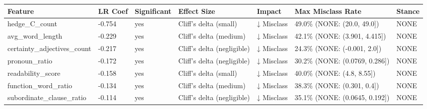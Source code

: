 \begin{tabular}{lllllll}
\toprule
Feature & LR Coef & Significant & Effect Size & Impact & Max Misclass Rate & Stance \\
\midrule
hedge\_C\_count & -0.754 & yes & Cliff's delta (small) & ↓ Misclass & 49.0\% (NONE: (20.0, 49.0]) & NONE \\
avg\_word\_length & -0.229 & yes & Cliff's delta (medium) & ↓ Misclass & 42.1\% (NONE: (3.901, 4.415]) & NONE \\
certainty\_adjectives\_count & -0.217 & yes & Cliff's delta (negligible) & ↓ Misclass & 24.3\% (NONE: (-0.001, 2.0]) & NONE \\
pronoun\_ratio & -0.172 & yes & Cliff's delta (negligible) & ↓ Misclass & 30.2\% (NONE: (0.0769, 0.286]) & NONE \\
readability\_score & -0.158 & yes & Cliff's delta (small) & ↓ Misclass & 40.0\% (NONE: (4.8, 8.55]) & NONE \\
function\_word\_ratio & -0.134 & yes & Cliff's delta (medium) & ↓ Misclass & 38.3\% (NONE: (0.301, 0.4]) & NONE \\
subordinate\_clause\_ratio & -0.114 & yes & Cliff's delta (negligible) & ↓ Misclass & 35.1\% (NONE: (0.0645, 0.192]) & NONE \\
\bottomrule
\end{tabular}
